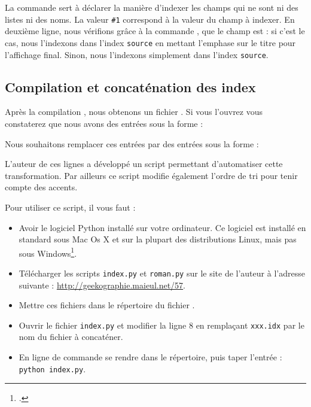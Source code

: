 La commande  sert à déclarer la manière d'indexer les champs qui ne sont ni des listes ni des noms. La valeur \verb|#1| correspond à la valeur du champ à indexer. En deuxième ligne, nous vérifions grâce à la commande , que le champ    est  : si c'est le cas, nous l'indexons dans l'index \verb|source| en mettant l'emphase sur le titre pour l'affichage final. Sinon, nous l'indexons simplement dans l'index \verb|source|.

\subsection{Compilation et concaténation des index}


Après la  compilation \XeLaTeX, nous obtenons un fichier . Si vous l'ouvrez vous constaterez que nous avons des entrées sous la forme : 

\begin{latexcode}
\end{latexcode}

Nous souhaitons remplacer ces entrées par des entrées sous la forme :

\begin{latexcode}
\end{latexcode}

L'auteur de ces lignes a développé un script permettant d'automatiser cette transformation. Par ailleurs ce script modifie également l'ordre de tri pour tenir compte des accents.

Pour utiliser ce script, il vous faut :\label{python}
\begin{itemize}
\item Avoir le logiciel Python installé sur votre ordinateur. Ce logiciel est installé en standard sous Mac Os X et sur la plupart des distributions Linux, mais pas sous Windows\footcite{python_windows}.
\item Télécharger les scripts \verb|index.py| et \verb|roman.py| sur le site de l'auteur à l'adresse suivante : \url{http://geekographie.maieul.net/57}.
\item Mettre ces fichiers dans le répertoire du fichier . 
\item Ouvrir le fichier \verb|index.py| et modifier la ligne 8 en remplaçant \verb|xxx.idx| par le nom du fichier à concaténer.
\item En ligne de commande se rendre dans le  répertoire, puis taper l'entrée : \verb|python index.py|.
\end{itemize}


